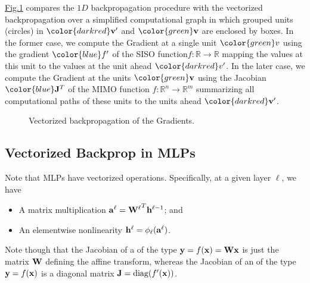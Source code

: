 \documentclass[letterpaper,10pt,english]{jupyterBook}
\let\sphinxpxdimen\pdfpxdimen\else\newdimen\sphinxpxdimen
\begin{document}
\hyperref[\detokenize{neuralnets_backprop:vectorized-backprop-fig}]{Fig.\@ \ref{\detokenize{neuralnets_backprop:vectorized-backprop-fig}}} compares the \(1D\) backpropagation procedure with the vectorized backpropagation over a simplified computational graph in which grouped units (circles) in \({\color{darkred} \mathbf{v}'}\) and \({\color{green}\mathbf{v}}\) are enclosed by boxes. In the former case, we compute the Gradient at a single unit \( {\color{green}v} \) using the gradient \( {\color{blue} f'} \) of the SISO function\( f: \mathbb{R} \rightarrow \mathbb{R} \) mapping the values at this unit to the values at the unit ahead \({\color{darkred}v'}\). In the later case, we compute the Gradient at the units \({\color{green}\mathbf{v}}\) using the Jacobian \( {\color{blue} \mathbf{J}^{T}} \) of the MIMO function \( f: \mathbb{R}^{n} \rightarrow \mathbb{R}^{m} \) summarizing all computational paths of these units to the units ahead \({\color{darkred} \mathbf{v}'}\).


\begin{figure}
\centering
\noindent\sphinxincludegraphics[height=640\sphinxpxdimen]{{jacobian}.svg}
\caption{Vectorized backpropagation of the Gradients.}\label{\detokenize{neuralnets_backprop:vectorized-backprop-fig}}\end{figure}


\subsection{Vectorized Backprop in MLPs}
\label{\detokenize{neuralnets_backprop:vectorized-backprop-in-mlps}}
\sphinxAtStartPar
Note that MLPs have  vectorized operations. Specifically, at a given layer \(\ell\), we have
\begin{itemize}
\item {} 
\sphinxAtStartPar
A matrix multiplication \({\bf a}^{\ell} = {{\bf W}^{\ell}}^{T} {\bf h}^{\ell-1}\); and

\item {} 
\sphinxAtStartPar
An element\sphinxhyphen{}wise nonlinearity \({\bf h}^{\ell} = \phi_{\ell}({\bf a}^{\ell})\).

\end{itemize}

\sphinxAtStartPar
Note though that the Jacobian of a  of the type \( {\bf y} = f({\bf x}) = {\bf W} {\bf x}\) is just the matrix \( {\bf W} \) defining the affine transform, whereas the Jacobian of an  of the type \({\bf y} = f({\bf x})\) is a diagonal matrix \( {\bf J} = \mathrm{diag}(f'({\bf x})) \).
\end{document}
